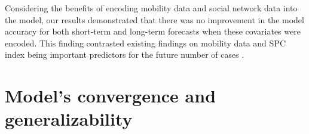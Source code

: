Considering the benefits of encoding mobility data and social network data into the model, our results demonstrated that there was no improvement in the model accuracy for both short-term and long-term forecasts when these covariates were encoded.
This finding contrasted existing findings on mobility data and \gls{SPC} index being important predictors for the future number of cases \cite{changMobilityNetworkModels2021,kuchlerGeographicSpreadCOVID192020}.

\section{Model's convergence and generalizability}